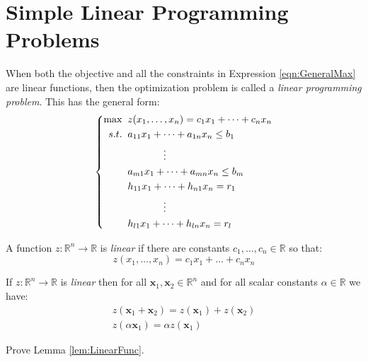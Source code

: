 \chapter{Simple Linear Programming Problems}
When both the objective and all the constraints in Expression \ref{eqn:GeneralMax} are linear functions, then the optimization problem is called a \textit{linear programming problem}. This has the general form:
\begin{equation}
\left\{
\begin{aligned}
\max\;\;& z(x_1,\dots,x_n) = c_1x_1 + \dots + c_nx_n\\
s.t.\;\;& a_{11}x_1 + \dots + a_{1n}x_n \leq b_1\\
& \hspace*{0.5in}\vdots\\
& a_{m1}x_1 + \dots + a_{mn} x_n \leq b_m\\
& h_{11}x_1 + \dots + h_{n1}x_n = r_1\\
&\hspace*{0.5in}\vdots\\
&h_{l1}x_1 + \dots + h_{ln}x_n = r_l
\end{aligned}
\right.
\label{eqn:GeneralLPMax}
\end{equation}

\begin{definition} A function $z:\mathbb{R}^n \rightarrow \mathbb{R}$ is \textit{linear} if there are constants $c_1,\dots,c_n \in \mathbb{R}$ so that:
\begin{equation}
z(x_1,\dots,x_n) = c_1x_1 + \dots + c_nx_n
\end{equation}
\label{def:LinearFunc}
\end{definition}

\begin{lemma} If $z:\mathbb{R}^n \rightarrow \mathbb{R}$ is \textit{linear} then for all $\mathbf{x}_1, \mathbf{x}_2 \in \mathbb{R}^n$ and for all scalar constants $\alpha \in \mathbb{R}$ we have:
\begin{gather}
z(\mathbf{x}_1 + \mathbf{x}_2) = z(\mathbf{x}_1) + z(\mathbf{x}_2)\\
z(\alpha \mathbf{x}_1) = \alpha z(\mathbf{x}_1)
\end{gather}
\label{lem:LinearFunc}
\end{lemma}

\begin{exercise} Prove Lemma \ref{lem:LinearFunc}.
\end{exercise}

